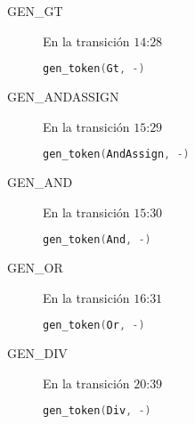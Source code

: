 \documentclass[a4paper]{CSMakotoTechnicalReport}
\begin{document}
\begin{multicols}{2}
\begin{description}
        \item[GEN\_GT] En la transición $14$:$28$
            \begin{lstlisting}[language=C]
 gen_token(Gt, -)
            \end{lstlisting}

        \item[GEN\_ANDASSIGN] En la transición $15$:$29$
            \begin{lstlisting}[language=C]
 gen_token(AndAssign, -)
            \end{lstlisting}

        \item[GEN\_AND] En la transición $15$:$30$
            \begin{lstlisting}[language=C]
 gen_token(And, -)
            \end{lstlisting}

        \item[GEN\_OR] En la transición $16$:$31$
            \begin{lstlisting}[language=C]
 gen_token(Or, -)
            \end{lstlisting}

        \item[GEN\_DIV] En la transición $20$:$39$
            \begin{lstlisting}[language=C]
 gen_token(Div, -)
            \end{lstlisting}

    \end{description}
    \end{multicols}
\end{document}
